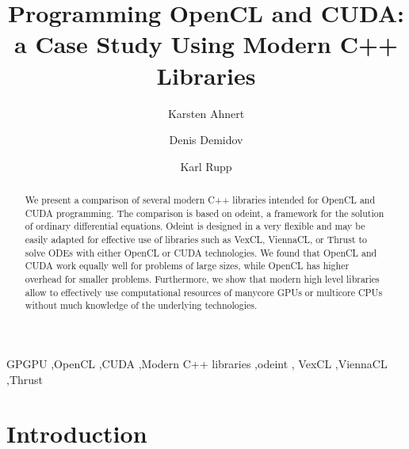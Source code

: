 \documentclass[1p]{elsarticle}
\begin{document}
\begin{frontmatter}

\title{Programming OpenCL and CUDA:\\a Case Study Using Modern C++ Libraries}

\author{Karsten Ahnert}
\address{
Institut f\"ur Physik und Astronomie, Universit\"at Potsdam,\\
Karl-Liebknecht-Strasse 24/25, 14476 Potsdam-Golm, Germany
}

\author{Denis Demidov}
\address{
Kazan Branch of Joint Supercomputer Center,
Russian Academy of Sciences,\\
Lobachevsky st. 2/31, 420008 Kazan, Russia
}

\author{Karl Rupp}
\address{Mathematics and Computer Science Division,
Argonne National Laboratory \\
9700 South Cass Avenue, Argonne, IL 60439, USA
}

\begin{abstract}
    We present a comparison of several modern C++ libraries intended for OpenCL
    and CUDA programming. The comparison is based on odeint, a framework for
    the solution of ordinary differential equations. Odeint is designed in a
    very flexible and may be easily adapted for effective use of libraries such
    as VexCL, ViennaCL, or Thrust to solve ODEs with either OpenCL or CUDA
    technologies. We found that OpenCL and CUDA work equally well for problems
    of large sizes, while OpenCL has higher overhead for smaller problems.
    Furthermore, we show that modern high level libraries allow to effectively
    use computational resources of manycore GPUs or multicore CPUs without much
    knowledge of the underlying technologies.
\end{abstract}

\begin{keyword}
    GPGPU \sep OpenCL \sep CUDA \sep Modern C++ libraries \sep odeint \sep
    VexCL \sep ViennaCL \sep Thrust
\end{keyword}

\end{frontmatter}





%
%
\section{Introduction}
\end{document}
